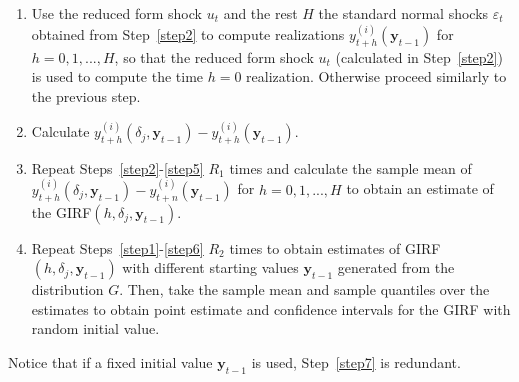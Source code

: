 \documentclass[nojss]{jss}
\begin{document}
\begin{appendix}
\begin{enumerate}
\item  Use the reduced form shock $u_t$ and the rest $H$ the standard normal shocks $\varepsilon_t$ obtained from  Step~\ref{step2} to compute realizations $y_{t+h}^{(i)}(\boldsymbol{y}_{t-1})$ for $h=0,1,...,H$, so that the reduced form shock $u_t$ (calculated in Step~\ref{step2}) is used to compute the time $h=0$ realization. Otherwise proceed similarly to the previous step.

\item Calculate $y_{t+h}^{(i)}(\delta_j,\boldsymbol{y}_{t-1}) - y_{t+h}^{(i)}(\boldsymbol{y}_{t-1})$.\label{step5}

\item Repeat Steps~\ref{step2}-\ref{step5} $R_1$ times and calculate the sample mean of $y_{t+h}^{(i)}(\delta_j,\boldsymbol{y}_{t-1}) - y_{t+n}^{(i)}(\boldsymbol{y}_{t-1})$ for $h=0,1,...,H$ to obtain an estimate of the GIRF$(h,\delta_j,\boldsymbol{y}_{t-1})$.\label{step6}

\item Repeat Steps~\ref{step1}-\ref{step6} $R_2$ times to obtain estimates of GIRF$(h,\delta_j,\boldsymbol{y}_{t-1})$ with different starting values $\boldsymbol{y}_{t-1}$ generated from the distribution $G$. Then, take the sample mean and sample quantiles over the estimates to obtain point estimate and confidence intervals for the GIRF with random initial value.\label{step7}
\end{enumerate}
Notice that if a fixed initial value $\boldsymbol{y}_{t-1}$ is used, Step~\ref{step7} is redundant.


\end{appendix}
\end{document}
